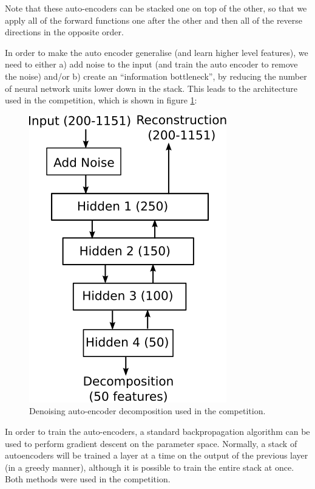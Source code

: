 \documentclass{article}
\begin{document}
Note that these auto-encoders can be stacked one on top of the other, so that we apply all of the forward functions one after the other and then all of the reverse directions in the opposite order.

In order to make the auto encoder generalise (and learn higher level features), we need to either a) add noise to the input (and train the auto encoder to remove the noise) and/or b) create an ``information bottleneck'', by reducing the number of neural network units lower down in the stack.  This leads to the architecture used in the competition, which is shown in figure \ref{fig:autoencoder-decomposition}:

\begin{figure}[ht]
\vskip 0.2in
\begin{center}
\centerline{\includegraphics{auto-encoder}}
\caption{Denoising auto-encoder decomposition used in the competition.}
\label{fig:autoencoder-decomposition}
\end{center}
\vskip -0.2in
\end{figure} 

In order to train the auto-encoders, a standard backpropagation algorithm can be used to perform gradient descent on the parameter space.  Normally, a stack of autoencoders will be trained a layer at a time on the output of the previous layer (in a greedy manner), although it is possible to train the entire stack at once.  Both methods were used in the competition.
\end{document}
